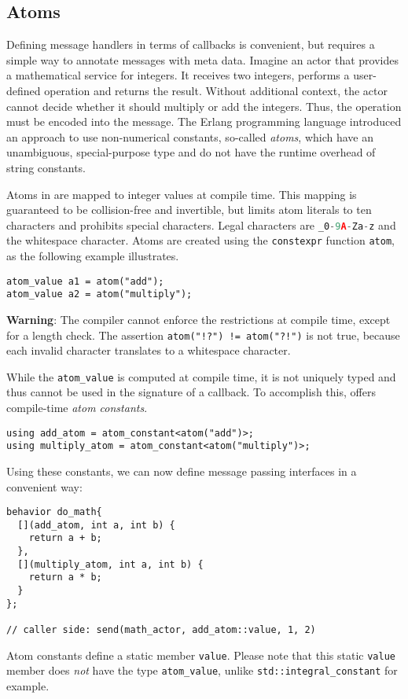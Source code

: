 \clearpage
\subsection{Atoms}
\label{atom}

Defining message handlers in terms of callbacks is convenient, but requires a simple way to annotate messages with meta data.
Imagine an actor that provides a mathematical service for integers.
It receives two integers, performs a user-defined operation and returns the result.
Without additional context, the actor cannot decide whether it should multiply or add the integers.
Thus, the operation must be encoded into the message.
The Erlang programming language introduced an approach to use non-numerical
constants, so-called \textit{atoms}, which have an unambiguous, special-purpose type and do not have the runtime overhead of string constants.

Atoms in \lib are mapped to integer values at compile time.
This mapping is guaranteed to be collision-free and invertible, but limits atom literals to ten characters and prohibits special characters.
Legal characters are \lstinline[language=C++]^_0-9A-Za-z^ and the whitespace character.
Atoms are created using the \lstinline^constexpr^ function \lstinline^atom^, as the following example illustrates.

\begin{lstlisting}
atom_value a1 = atom("add");
atom_value a2 = atom("multiply");
\end{lstlisting}

\textbf{Warning}: The compiler cannot enforce the restrictions at compile time, except for a length check.
The assertion \lstinline^atom("!?") != atom("?!")^ is not true, because each invalid character translates to a whitespace character.

While the \lstinline^atom_value^ is computed at compile time, it is not uniquely typed and thus cannot be used in the signature of a callback.
To accomplish this, \lib offers compile-time \emph{atom constants}.

\begin{lstlisting}
using add_atom = atom_constant<atom("add")>;
using multiply_atom = atom_constant<atom("multiply")>;
\end{lstlisting}

Using these constants, we can now define message passing interfaces in a convenient way:

\begin{lstlisting}
behavior do_math{
  [](add_atom, int a, int b) {
    return a + b;
  },
  [](multiply_atom, int a, int b) {
    return a * b;
  }
};

// caller side: send(math_actor, add_atom::value, 1, 2)
\end{lstlisting}

Atom constants define a static member \lstinline^value^.
Please note that this static \lstinline^value^ member does \emph{not} have the type \lstinline^atom_value^, unlike \lstinline^std::integral_constant^ for example.

